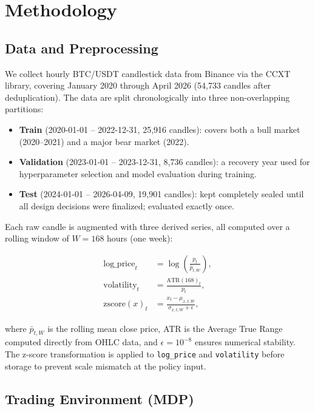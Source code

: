\documentclass[11pt, a4paper]{article}
\begin{document}
\section{Methodology}

\subsection{Data and Preprocessing}

We collect hourly BTC/USDT candlestick data from Binance via the CCXT library,
covering January 2020 through April 2026 (54,733 candles after deduplication).
The data are split chronologically into three non-overlapping partitions:

\begin{itemize}
    \item \textbf{Train} (2020-01-01 -- 2022-12-31, 25,916 candles): covers both a bull
          market (2020--2021) and a major bear market (2022).
    \item \textbf{Validation} (2023-01-01 -- 2023-12-31, 8,736 candles): a recovery year
          used for hyperparameter selection and model evaluation during training.
    \item \textbf{Test} (2024-01-01 -- 2026-04-09, 19,901 candles): kept completely sealed
          until all design decisions were finalized; evaluated exactly once.
\end{itemize}

Each raw candle is augmented with three derived series, all computed over a rolling
window of $W = 168$ hours (one week):

\begin{align}
    \text{log\_price}_t &= \log\!\left(\frac{p_t}{\bar{p}_{t,W}}\right), \\
    \text{volatility}_t &= \frac{\text{ATR}(168)_t}{p_t}, \\
    \text{zscore}(x)_t  &= \frac{x_t - \mu_{x,t,W}}{\sigma_{x,t,W} + \epsilon},
\end{align}

where $\bar{p}_{t,W}$ is the rolling mean close price, ATR is the Average True Range
computed directly from OHLC data, and $\epsilon = 10^{-8}$ ensures numerical
stability.
The z-score transformation is applied to \texttt{log\_price} and \texttt{volatility}
before storage to prevent scale mismatch at the policy input.

\subsection{Trading Environment (MDP)}
\end{document}
